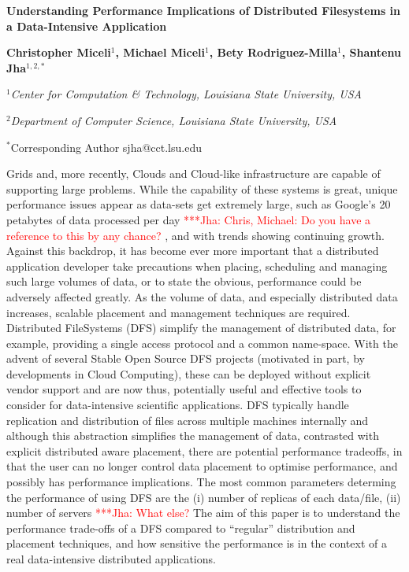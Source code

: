 \documentclass[a4paper,11pt]{article}
\newcommand{\jhanote}[1]{ {\textcolor{red} { ***Jha: #1 }}}
\newcommand{\jhanote}[1]{}
\begin{document}
\begin{center}

\textbf{\large Understanding Performance Implications of Distributed Filesystems in a Data-Intensive Application}

\vspace{0.05in}

\textbf{Christopher Miceli$^{1}$, Michael Miceli$^{1}$, Bety Rodriguez-Milla$^{1}$, Shantenu Jha$^{1,2,*}$}

\small{\emph{$^{1}$Center for Computation \& Technology, Louisiana State University, USA}}

\small{\emph{$^{2}$Department of Computer Science, Louisiana State University, USA}}

{\footnotesize {\hspace{0.0 in} $^*$Corresponding Author sjha@cct.lsu.edu}}

\end{center}


Grids and, more recently, Clouds and Cloud-like infrastructure are capable of supporting large problems. While the capability of these systems is great, unique performance issues appear as data-sets get extremely large, such as Google's 20 petabytes of data processed per day\jhanote{Chris, Michael: Do you have a reference to this by any chance?}, and with trends showing continuing growth. Against this backdrop, it has become ever more important that a distributed application developer take precautions when placing, scheduling and managing such large volumes of data, or to state the obvious, performance could be adversely affected greatly. As the volume of data, and especially distributed data increases, scalable placement and management techniques are required.  Distributed FileSystems (DFS) simplify the management of distributed data, for example, providing a single access protocol and a common name-space. With the advent of several Stable Open Source DFS projects (motivated in part, by developments in Cloud Computing), these can be deployed without explicit vendor support and are now thus, potentially useful and effective tools to consider for data-intensive scientific applications.  DFS typically handle replication and distribution of files across multiple machines internally and although this abstraction simplifies the management of data, contrasted with explicit distributed aware placement, there are potential performance tradeoffs, in that the user can no longer control data placement to optimise performance, and possibly has performance implications.  The most common parameters determing the 
performance of using DFS are the (i) number of replicas of each data/file, (ii) number of servers \jhanote{What else?}  The aim of this paper is to understand the performance trade-offs of a DFS compared to ``regular'' distribution and placement techniques, and how sensitive the performance is in the context of 
a real data-intensive distributed applications.
\end{document}

